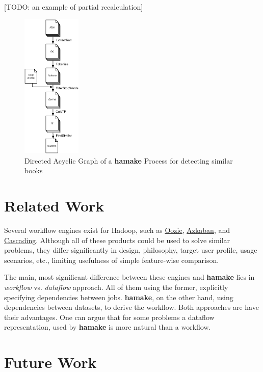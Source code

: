 \documentclass[10pt,conference,letterpaper]{IEEEtran}
\begin{document}
[TODO: an example of partial recalculation]

\begin{figure}[htp]
\centering
\includegraphics[width=0.25\textwidth]{SimilarityAlgDAG.eps}
\caption{Directed Acyclic Graph of a \textbf{hamake} Process for detecting similar books}
\label{fig:SimilarityAlgDAG}
\end{figure}

\section{Related Work}

Several workflow engines exist for Hadoop, such as
\href{http://github.com/tucu00/oozie1}{Oozie},
\href{http://sna-projects.com/azkaban/}{Azkaban}, and
\href{http://www.cascading.org/}{Cascading}.  Although all of these
products could be used to solve similar problems, they differ
significantly in design, philosophy, target user profile, usage
scenarios, etc., limiting usefulness of simple feature-wise
comparison.

The main, most significant difference between these engines and \textbf{hamake}
lies in \textit{workflow} vs. \textit{dataflow} approach. All of them
using the former, explicitly specifying dependencies between
jobs. \textbf{hamake}, on the other hand, using dependencies between datasets,
to derive the workflow. Both approaches are have their advantages. One
can argue that for some problems a dataflow representation, used by
\textbf{hamake} is more natural than a workflow.

\section{Future Work}
\end{document}
